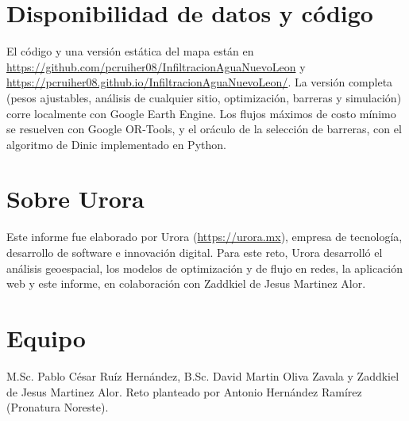 \documentclass[11pt,letterpaper]{article}
\begin{document}
\section*{Disponibilidad de datos y código}

El código y una versión estática del mapa están en \url{https://github.com/pcruiher08/InfiltracionAguaNuevoLeon} y \url{https://pcruiher08.github.io/InfiltracionAguaNuevoLeon/}. La versión completa (pesos ajustables, análisis de cualquier sitio, optimización, barreras y simulación) corre localmente con Google Earth Engine. Los flujos máximos de costo mínimo se resuelven con Google OR-Tools, y el oráculo de la selección de barreras, con el algoritmo de Dinic implementado en Python.

\section*{Sobre Urora}

Este informe fue elaborado por Urora (\url{https://urora.mx}), empresa de tecnología, desarrollo de software e innovación digital. Para este reto, Urora desarrolló el análisis geoespacial, los modelos de optimización y de flujo en redes, la aplicación web y este informe, en colaboración con Zaddkiel de Jesus Martinez Alor.

\section*{Equipo}

M.Sc. Pablo César Ruíz Hernández, B.Sc. David Martin Oliva Zavala y Zaddkiel de Jesus Martinez Alor. Reto planteado por Antonio Hernández Ramírez (Pronatura Noreste).
\end{document}
